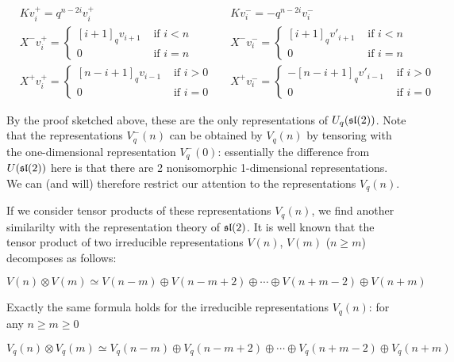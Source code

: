 \begin{align*}
    &K v^+_i = q^{n-2i} v^+_i  &
    &K v^-_i = -q^{n-2i} v^-_i \\
    &X^- v^+_i = \begin{cases} [i+1]_qv_{i+1}& \text{ if $i < n$} \\ 0& \text{ if $i = n$} \end{cases} &
    &X^- v^-_i = \begin{cases} [i+1]_qv'_{i+1}& \text{ if $i < n$} \\ 0& \text{ if $i = n$} \end{cases} \\
    & X^+  v^+_i = \begin{cases} 
                     [n-i+1]_qv_{i-1}& \text{ if $i > 0$} \\ 
                    0& \text{ if $i = 0$} 
             \end{cases} &
    & X^+  v^-_i = \begin{cases} 
                    -[n-i+1]_q v'_{i-1}& \text{ if $i > 0$} \\ 
                    0& \text{ if $i = 0$} 
             \end{cases}
\end{align*}

By the proof sketched above, these are the only representations of
$U_q(\mathfrak{sl}(2))$.  Note that the representations $V_q^-(n)$ can be obtained by
$V_q(n)$ by tensoring with the one-dimensional representation $V_q^-(0)$:
essentially the difference from $U(\mathfrak{sl}(2))$ here is that there are 2
nonisomorphic 1-dimensional representations. We can (and will) therefore
restrict our attention to the representations $V_q(n)$.

If we consider tensor products of these representations $V_q(n)$, we find
another similarilty with the representation theory of $\mathfrak{sl}(2)$. It is well
known that the tensor product of two irreducible representations $V(n)$, $V(m)$
($n \geq m$) decomposes as follows:

\begin{equation}
V(n) \otimes V(m) \simeq V(n-m) \oplus V(n-m+2)  \oplus \cdots \oplus V(n+m-2)\oplus V(n+m)
\end{equation}

Exactly the same formula holds for the irreducible representations $V_q(n)$: for any $n \geq m \geq 0$

\begin{equation}
V_q(n) \otimes V_q(m) \simeq V_q(n-m) \oplus V_q(n-m+2)  \oplus \cdots \oplus V_q(n+m-2)\oplus V_q(n+m)
\end{equation}


